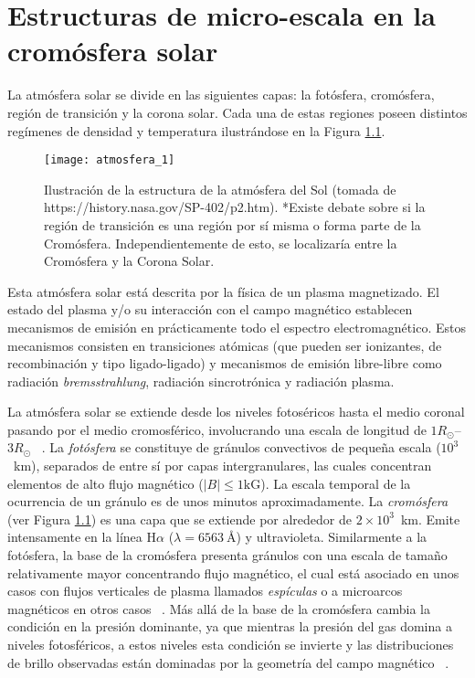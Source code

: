 \chapter{Estructuras de micro-escala en la crom\'osfera solar}

La atm\'osfera solar se divide en las siguientes capas: la fot\'osfera, crom\'osfera, regi\'on de transici\'on y la corona solar. Cada una de estas regiones poseen distintos reg\'imenes de densidad y temperatura ilustr\'andose en la Figura \ref{atmosfera_solar}.

\begin{figure}[ht]
\centering
\texttt{[image: atmosfera\_1]}
\caption{Ilustraci\'on de la estructura de la atm\'osfera del Sol (tomada de https://history.nasa.gov/SP-402/p2.htm). \newline
*Existe debate sobre si la regi\'on de transici\'on es una regi\'on por s\'i misma o forma parte de la Crom\'osfera. Independientemente de esto, se localizar\'ia entre la Crom\'osfera y la Corona Solar.} \label{atmosfera_solar}
\end{figure}

Esta atm\'osfera solar est\'a descrita por la f\'isica de un plasma magnetizado. El estado del plasma y/o su interacci\'on con el campo magn\'etico establecen mecanismos de emisi\'on en pr\'acticamente todo el espectro electromagn\'etico. Estos mecanismos consisten en transiciones at\'omicas (que pueden ser ionizantes, de recombinaci\'on y tipo ligado-ligado) y mecanismos de emisi\'on libre-libre como radiaci\'on \emph{bremsstrahlung}, radiaci\'on sincrotr\'onica y radiaci\'on plasma.  ~\citep{ashwanden}

La atm\'osfera solar se extiende desde los niveles fotos\'ericos hasta el medio coronal pasando por el medio cromosf\'erico, involucrando una escala de longitud de $1R_{\odot}$--$3R_{\odot}$ ~\citep{NASAsun}. La \emph{fot\'osfera} se constituye de gr\'anulos convectivos de peque\~na escala ($10^3$~km), separados de entre s\'i por capas intergranulares, las cuales concentran elementos de alto flujo magn\'etico ($|B| \le 1\mbox{kG}$). La escala temporal de la ocurrencia de un gr\'anulo es de unos minutos aproximadamente. La \emph{crom\'osfera} (ver Figura \ref{atmosfera_solar}) es una capa que se extiende por alrededor de $2\times 10^3$~km. Emite intensamente en la l\'inea H$\alpha$ ($\lambda=6563~\mbox{\AA}$) y ultravioleta. Similarmente a la fot\'osfera, la base de la crom\'osfera presenta gr\'anulos con una escala de tama\~no relativamente mayor concentrando flujo magn\'etico, el cual est\'a asociado en unos casos con flujos verticales de plasma llamados \emph{esp\'iculas} o a microarcos magn\'eticos en otros casos ~\citep{NASAweb}. M\'as all\'a de la base de la crom\'osfera cambia la condici\'on en la presi\'on dominante, ya que mientras la presi\'on del gas domina a niveles fotosf\'ericos, a estos niveles esta condici\'on se invierte y las distribuciones de brillo observadas est\'an dominadas por la geometr\'ia del campo magn\'etico ~\citep{priest}.

